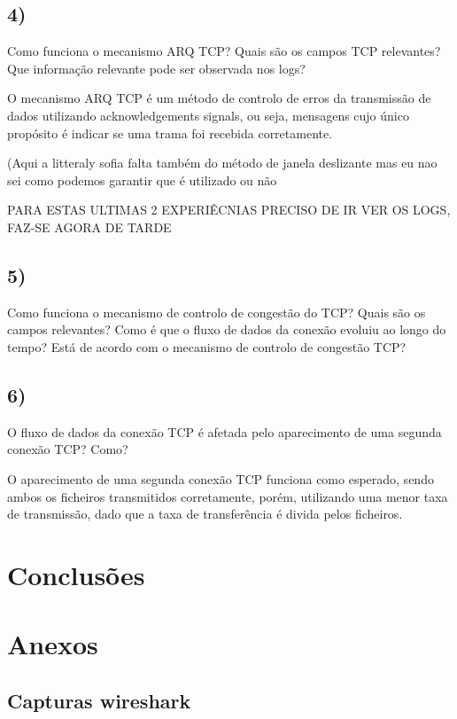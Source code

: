 \documentclass[11pt]{article}
\begin{document}
\subsection{4)} Como funciona o mecanismo ARQ TCP? Quais são os campos TCP relevantes? Que informação relevante pode ser observada nos logs?

O mecanismo ARQ TCP é um método de controlo de erros da transmissão de dados utilizando acknowledgements signals, ou seja, mensagens cujo único propósito é indicar se uma trama foi recebida corretamente.

(Aqui a litteraly sofia falta também do método de janela deslizante mas eu nao sei como podemos garantir que é utilizado ou não

PARA ESTAS ULTIMAS 2 EXPERIÊCNIAS PRECISO DE IR VER OS LOGS, FAZ-SE AGORA DE TARDE

\subsection{5)} Como funciona o mecanismo de controlo de congestão do TCP? Quais são os campos relevantes? Como é que o fluxo de dados da conexão evoluiu ao longo do tempo? Está de acordo com o mecanismo de controlo de congestão TCP?



\subsection{6)} O fluxo de dados da conexão TCP é afetada pelo aparecimento de uma segunda conexão TCP? Como?

O aparecimento de uma segunda conexão TCP funciona como esperado, sendo ambos os ficheiros transmitidos corretamente, porém, utilizando uma menor taxa de transmissão, dado que a taxa de transferência é divida pelos ficheiros.


\section{Conclusões}

\section{Anexos}

\subsection{Capturas wireshark}
\end{document}
